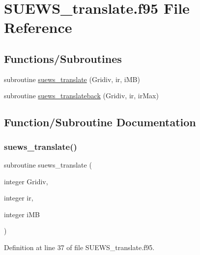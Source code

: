 \hypertarget{_s_u_e_w_s__translate_8f95}{}\section{S\+U\+E\+W\+S\+\_\+translate.\+f95 File Reference}
\label{_s_u_e_w_s__translate_8f95}
\subsection*{Functions/\+Subroutines}
\begin{DoxyCompactItemize}
\item 
subroutine \hyperlink{_s_u_e_w_s__translate_8f95_abf8ea565715e31244a76de2908c9fc4b}{suews\+\_\+translate} (Gridiv, ir, i\+MB)
\item 
subroutine \hyperlink{_s_u_e_w_s__translate_8f95_a5c6d5265e5c9daebbaaff8999791406e}{suews\+\_\+translateback} (Gridiv, ir, ir\+Max)
\end{DoxyCompactItemize}


\subsection{Function/\+Subroutine Documentation}
\mbox{\label{_s_u_e_w_s__translate_8f95_abf8ea565715e31244a76de2908c9fc4b}} 
\subsubsection{\texorpdfstring{suews\+\_\+translate()}{suews\_translate()}}
{\footnotesize\ttfamily subroutine suews\+\_\+translate (\begin{DoxyParamCaption}\item[{integer}]{Gridiv,  }\item[{integer}]{ir,  }\item[{integer}]{i\+MB }\end{DoxyParamCaption})}



Definition at line 37 of file S\+U\+E\+W\+S\+\_\+translate.\+f95.

